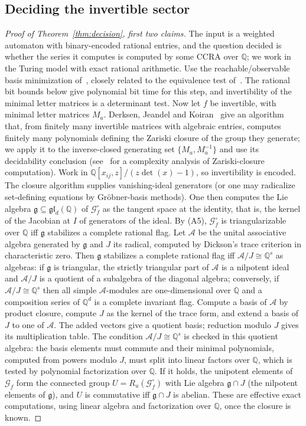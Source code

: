 \documentclass[11pt,letterpaper]{article}
\newcommand{\Q}{\mathbb{Q}}
\newcommand{\cG}{\mathcal{G}}
\newcommand{\cA}{\mathcal{A}}
\newcommand{\fg}{\mathfrak{g}}
\theoremstyle{definition}
\begin{document}
\subsection{Deciding the invertible sector}
\begin{proof}[Proof of Theorem~\ref{thm:decision}, first two claims]
The input is a weighted automaton with binary-encoded rational entries, and the question decided is whether the series it computes is computed by some CCRA over $\Q$; we work in the Turing model with exact rational arithmetic. Use the reachable/observable basis minimization of~\cite[Chapter~2]{BR11}, closely related to the equivalence test of~\cite{Tze92}. The rational bit bounds below give polynomial bit time for this step, and invertibility of the minimal letter matrices is a determinant test. Now let $f$ be invertible, with minimal letter matrices $M_a$. Derksen, Jeandel and Koiran~\cite{DJK05} give an algorithm that, from finitely many invertible matrices with algebraic entries, computes finitely many polynomials defining the Zariski closure of the group they generate; we apply it to the inverse-closed generating set $\{M_a,M_a^{-1}\}$ and use its decidability conclusion (see~\cite{NPSSW22} for a complexity analysis of Zariski-closure computation). Work in $\Q[x_{ij},z]/(z\det(x)-1)$, so invertibility is encoded. The closure algorithm supplies vanishing-ideal generators (or one may radicalize set-defining equations by Gr\"obner-basis methods). One then computes the Lie algebra $\fg\subseteq\mathfrak{gl}_d(\Q)$ of $\cG_f^\circ$ as the tangent space at the identity, that is, the kernel of the Jacobian at $I$ of generators of the ideal. By (A5), $\cG_f^\circ$ is triangularizable over $\Q$ iff $\fg$ stabilizes a complete rational flag. Let $\cA$ be the unital associative algebra generated by $\fg$ and $J$ its radical, computed by Dickson's trace criterion in characteristic zero. Then $\fg$ stabilizes a complete rational flag iff $\cA/J\cong\Q^s$ as algebras: if $\fg$ is triangular, the strictly triangular part of $\cA$ is a nilpotent ideal and $\cA/J$ is a quotient of a subalgebra of the diagonal algebra; conversely, if $\cA/J\cong\Q^s$ then all simple $\cA$-modules are one-dimensional over $\Q$ and a composition series of $\Q^d$ is a complete invariant flag. Compute a basis of $\cA$ by product closure, compute $J$ as the kernel of the trace form, and extend a basis of $J$ to one of $\cA$. The added vectors give a quotient basis; reduction modulo $J$ gives its multiplication table. The condition $\cA/J\cong\Q^s$ is checked in this quotient algebra: the basis elements must commute and their minimal polynomials, computed from powers modulo $J$, must split into linear factors over $\Q$, which is tested by polynomial factorization over $\Q$. If it holds, the unipotent elements of $\cG_f$ form the connected group $U=R_u(\cG_f^\circ)$ with Lie algebra $\fg\cap J$ (the nilpotent elements of $\fg$), and $U$ is commutative iff $\fg\cap J$ is abelian. These are effective exact computations, using linear algebra and factorization over $\Q$, once the closure is known.
\end{proof}
\end{document}

